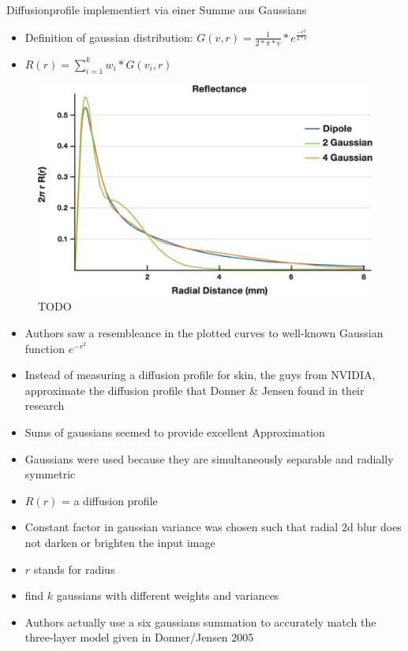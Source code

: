\documentclass[ngerman,runningheads,a4paper]{llncs}[2018/03/10]
\begin{document}
Diffusionprofile implementiert via einer Summe aus Gaussians

\begin{itemize}
  \item Definition of gaussian distribution: $G(v, r) = \frac{1}{2 * \pi * v} * e^{\frac{-r^{2}}{2*v}}$
  \item $R(r) = \sum\nolimits_{i=1}^k w_i * G(v_i, r)$
\end{itemize}

\begin{figure}[!h]
\includegraphics[scale=0.65,keepaspectratio]{./images/approximation-gaussians}
\caption{TODO}
\end{figure}

\begin{itemize}
  \item Authors saw a resembleance in the plotted curves to well-known Gaussian function $e^{-r^2}$
  \item Instead of measuring a diffusion profile for skin, the guys from NVIDIA, approximate the diffusion profile that Donner \& Jensen found in their research
  \item Sums of gaussians seemed to provide excellent Approximation
  \item Gaussians were used because they are simultaneously separable and radially symmetric
  \item $R(r)$ = a diffusion profile
  \item Constant factor in gaussian variance was chosen such that radial 2d blur does not darken or brighten the input image
  \item $r$ stands for radius
  \item find $k$ gaussians with different weights and variances
  \item Authors actually use a six gaussians summation to accurately match the three-layer model given in Donner/Jensen 2005
\end{itemize}
\end{document}
